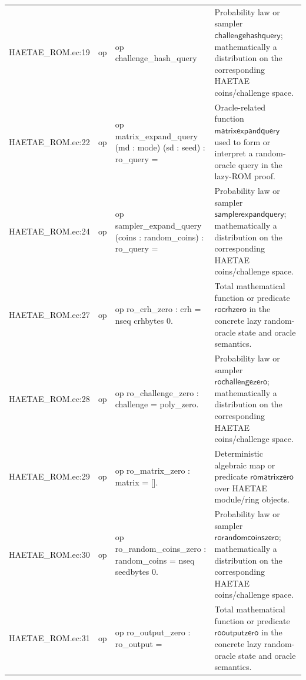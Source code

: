 \documentclass[10pt]{article}
\begin{document}
\begin{longtable}{L{0.11\textwidth}L{0.055\textwidth}L{0.385\textwidth}L{0.41\textwidth}}
HAETAE\_\allowbreak{}ROM.\allowbreak{}ec:\allowbreak{}19 & op & {\ttfamily\scriptsize op challenge\_\allowbreak{}hash\_\allowbreak{}query} & Probability law or sampler $\mathsf{challengehashquery}$; mathematically a distribution on the corresponding HAETAE coins/challenge space. \\
HAETAE\_\allowbreak{}ROM.\allowbreak{}ec:\allowbreak{}22 & op & {\ttfamily\scriptsize op matrix\_\allowbreak{}expand\_\allowbreak{}query (md : mode) (sd : seed) : ro\_\allowbreak{}query =} & Oracle-related function $\mathsf{matrixexpandquery}$ used to form or interpret a random-oracle query in the lazy-ROM proof. \\
HAETAE\_\allowbreak{}ROM.\allowbreak{}ec:\allowbreak{}24 & op & {\ttfamily\scriptsize op sampler\_\allowbreak{}expand\_\allowbreak{}query (coins : random\_\allowbreak{}coins) : ro\_\allowbreak{}query =} & Probability law or sampler $\mathsf{samplerexpandquery}$; mathematically a distribution on the corresponding HAETAE coins/challenge space. \\
HAETAE\_\allowbreak{}ROM.\allowbreak{}ec:\allowbreak{}27 & op & {\ttfamily\scriptsize op ro\_\allowbreak{}crh\_\allowbreak{}zero : crh = nseq crhbytes 0.} & Total mathematical function or predicate $\mathsf{rocrhzero}$ in the concrete lazy random-oracle state and oracle semantics. \\
HAETAE\_\allowbreak{}ROM.\allowbreak{}ec:\allowbreak{}28 & op & {\ttfamily\scriptsize op ro\_\allowbreak{}challenge\_\allowbreak{}zero : challenge = poly\_\allowbreak{}zero.} & Probability law or sampler $\mathsf{rochallengezero}$; mathematically a distribution on the corresponding HAETAE coins/challenge space. \\
HAETAE\_\allowbreak{}ROM.\allowbreak{}ec:\allowbreak{}29 & op & {\ttfamily\scriptsize op ro\_\allowbreak{}matrix\_\allowbreak{}zero : matrix = [].} & Deterministic algebraic map or predicate $\mathsf{romatrixzero}$ over HAETAE module/ring objects. \\
HAETAE\_\allowbreak{}ROM.\allowbreak{}ec:\allowbreak{}30 & op & {\ttfamily\scriptsize op ro\_\allowbreak{}random\_\allowbreak{}coins\_\allowbreak{}zero : random\_\allowbreak{}coins = nseq seedbytes 0.} & Probability law or sampler $\mathsf{rorandomcoinszero}$; mathematically a distribution on the corresponding HAETAE coins/challenge space. \\
HAETAE\_\allowbreak{}ROM.\allowbreak{}ec:\allowbreak{}31 & op & {\ttfamily\scriptsize op ro\_\allowbreak{}output\_\allowbreak{}zero : ro\_\allowbreak{}output =} & Total mathematical function or predicate $\mathsf{rooutputzero}$ in the concrete lazy random-oracle state and oracle semantics. \\

\end{longtable}
\end{document}

